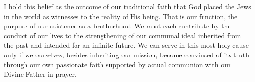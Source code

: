 I hold this belief as the outcome of our traditional
faith that God placed the Jews in the world as witnesses
to the reality of His being. That is our function, the
purpose of our existence as a brotherhood. We must each
contribute by the conduct of our lives to the strengthening
of our communal ideal inherited from the past and
intended for an infinite future. We can serve in this
most holy cause only if we ourselves, besides inheriting
our mission, become convinced of its truth through our
own passionate faith supported by actual communion
with our Divine Father in prayer.
